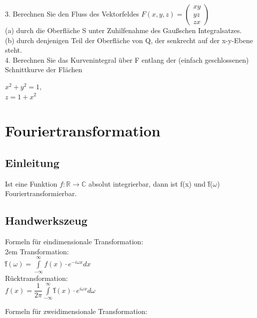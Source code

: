 \documentclass[11pt,final]{scrreprt}
\newcommand{\R} {\mathbb R}
\newcommand{\C} {\mathbb C}
\begin{document}
3. Berechnen Sie den Fluss des Vektorfeldes $F(x, y, z) =\left(\begin{matrix}
xy\\yz\\zx
\end{matrix}\right)$\\
\hspace*{2em}(a) durch die Oberfläche S unter Zuhilfenahme des Gaußschen Integralsatzes.\\
\hspace*{2em}(b) durch denjenigen Teil der Oberfläche von Q, der senkrecht auf der x-y-Ebene steht.\\

4. Berechnen Sie das Kurvenintegral über F entlang der (einfach geschlossenen) Schnittkurve der Flächen\\
\begin{center}
$x^2 + y^2 = 1,$\\
$z = 1+x^2$
\end{center}

\chapter{Fouriertransformation}

\section{Einleitung}

Ist eine Funktion $ f \colon \R \to \C $ absolut integrierbar, dann ist f(x) und \^{f}($\omega$) Fouriertransformierbar.

\section{Handwerkszeug}

Formeln für eindimensionale Transformation:\\

\begingroup
\leftskip2em 
Transformation:\\
\^{f}$(\omega) = \int\limits_{-\infty}^{\infty} f(x) \cdot e^{-i\omega x } dx $\\
Rücktransformation:\\
$ f(x) = \dfrac{1}{2\pi} \int\limits_{-\infty}^{\infty} $\^{f}$ (x) \cdot e^{i\omega x} d\omega $\\
\par	
\endgroup

Formeln für zweidimensionale Transformation:\\
\end{document}
